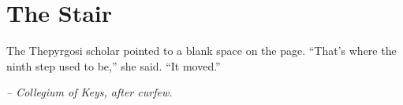 \chapter*{The Stair}

The Thepyrgosi scholar pointed to a blank space on the page. ``That's where the ninth step used to be,'' she said. ``It moved.''

\smallskip

\noindent \textit{-- Collegium of Keys, after curfew.}

